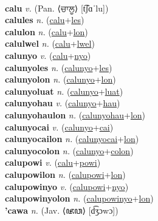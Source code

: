  \label{cayniki} \\
\textbf{calu} \textit{v.} (Pan. ⟨ਚਾਲੂ⟩ [t͡ʃɑˈlu])
 \label{calu} \\
\textbf{calules} \textit{n.} (\hyperref[calu]{calu}+\hyperref[les]{les})
 \label{calules} \\
\textbf{calulon} \textit{n.} (\hyperref[calu]{calu}+\hyperref[lon]{lon})
 \label{calulon} \\
\textbf{calulwel} \textit{n.} (\hyperref[calu]{calu}+\hyperref[lwel]{lwel})
 \label{calulwel} \\
\textbf{calunyo} \textit{v.} (\hyperref[calu]{calu}+\hyperref[nyo]{nyo})
 \label{calunyo} \\
\textbf{calunyoles} \textit{n.} (\hyperref[calunyo]{calunyo}+\hyperref[les]{les})
 \label{calunyoles} \\
\textbf{calunyolon} \textit{n.} (\hyperref[calunyo]{calunyo}+\hyperref[lon]{lon})
 \label{calunyolon} \\
\textbf{calunyoluat} \textit{n.} (\hyperref[calunyo]{calunyo}+\hyperref[luat]{luat})
 \label{calunyoluat} \\
\textbf{calunyohau} \textit{v.} (\hyperref[calunyo]{calunyo}+\hyperref[hau]{hau})
 \label{calunyohau} \\
\textbf{calunyohaulon} \textit{n.} (\hyperref[calunyohau]{calunyohau}+\hyperref[lon]{lon})
 \label{calunyohaulon} \\
\textbf{calunyocai} \textit{v.} (\hyperref[calunyo]{calunyo}+\hyperref[cai]{cai})
 \label{calunyocai} \\
\textbf{calunyocailon} \textit{n.} (\hyperref[calunyocai]{calunyocai}+\hyperref[lon]{lon})
 \label{calunyocailon} \\
\textbf{calunyocolon} \textit{n.} (\hyperref[calunyo]{calunyo}+\hyperref[colon]{colon})
 \label{calunyocolon} \\
\textbf{calupowi} \textit{v.} (\hyperref[calu]{calu}+\hyperref[powi]{powi})
 \label{calupowi} \\
\textbf{calupowilon} \textit{n.} (\hyperref[calupowi]{calupowi}+\hyperref[lon]{lon})
 \label{calupowilon} \\
\textbf{calupowinyo} \textit{v.} (\hyperref[calupowi]{calupowi}+\hyperref[nyo]{nyo})
 \label{calupowinyo} \\
\textbf{calupowinyolon} \textit{n.} (\hyperref[calupowinyo]{calupowinyo}+\hyperref[lon]{lon})
 \label{calupowinyolon} \\
\textbf{'cawa} \textit{n.} (Jav. ⟨ꦗꦮ⟩ [d͡ʒɔwɔ])
 \label{'cawa} \\
